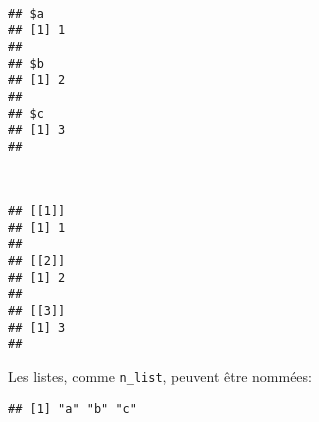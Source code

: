 \begin{knitrout}
\color{fgcolor}\begin{kframe}
\begin{flushleft}
\ttfamily\noindent
{}\hlassignement{\usebox{\hlnormalsizeboxlessthan}-}{\ }\hlkeyword{(}\hlargument{=}{\ }\hlkeyword{,}{\ }\hlargument{=}{\ }\hlkeyword{,}{\ }\hlargument{=}{\ }\hlkeyword{)}\hspace*{\fill}\\
\hlstd{}\mbox{}
\normalfont
\end{flushleft}
\begin{verbatim}
## $a
## [1] 1
## 
## $b
## [1] 2
## 
## $c
## [1] 3
## 
\end{verbatim}
\begin{flushleft}
\ttfamily\noindent
{}\hlassignement{\usebox{\hlnormalsizeboxlessthan}-}{\ }\hlkeyword{(}\hlkeyword{,}{\ }\hlkeyword{,}{\ }\hlkeyword{)}\hspace*{\fill}\\
\hlstd{}\mbox{}
\normalfont
\end{flushleft}
\begin{verbatim}
## [[1]]
## [1] 1
## 
## [[2]]
## [1] 2
## 
## [[3]]
## [1] 3
## 
\end{verbatim}
\end{kframe}
\end{knitrout}


Les listes, comme \texttt{n\_list}, peuvent être nommées:

\begin{knitrout}
\color{fgcolor}\begin{kframe}
\begin{flushleft}
\ttfamily\noindent
{}\hlkeyword{(}\hlkeyword{)}\mbox{}
\normalfont
\end{flushleft}
\begin{verbatim}
## [1] "a" "b" "c"
\end{verbatim}
\end{kframe}
\end{knitrout}


